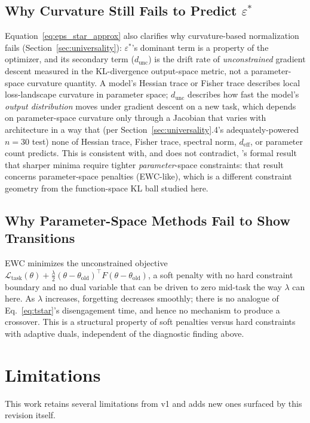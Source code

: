 \documentclass[11pt]{article}
\newcommand{\eps}{\varepsilon}
\newcommand{\epsstar}{\eps^{*}}
\begin{document}
\subsection{Why Curvature Still Fails to Predict $\epsstar$}
Equation~\ref{eq:eps_star_approx} also clarifies why curvature-based
normalization fails (Section~\ref{sec:universality}): $\epsstar$'s dominant
term is a property of the optimizer, and its secondary term
($d_{\mathrm{unc}}$) is the drift rate of \emph{unconstrained} gradient
descent measured in the KL-divergence output-space metric, not a
parameter-space curvature quantity. A model's Hessian trace or Fisher trace
describes local loss-landscape curvature in parameter space; $d_{\mathrm{unc}}$
describes how fast the model's \emph{output distribution} moves under
gradient descent on a new task, which depends on parameter-space curvature
only through a Jacobian that varies with architecture in a way that (per
Section~\ref{sec:universality}.4's adequately-powered $n=30$ test)
none of Hessian trace, Fisher trace, spectral norm, $d_{\mathrm{eff}}$, or
parameter count predicts. This is consistent with, and does not
contradict, \citet{parameterisolation2023}'s formal result that sharper
minima require tighter \emph{parameter}-space constraints: that result
concerns parameter-space penalties (EWC-like), which is a different
constraint geometry from the function-space KL ball studied here.

\subsection{Why Parameter-Space Methods Fail to Show Transitions}
EWC minimizes the unconstrained objective $\mathcal{L}_{\mathrm{task}}(\theta)
+ \frac{\lambda}{2}(\theta-\theta_{\mathrm{old}})^\top F(\theta-\theta_{\mathrm{old}})$,
a soft penalty with no hard constraint boundary and no dual variable that
can be driven to zero mid-task the way $\lambda$ can here. As $\lambda$
increases, forgetting decreases smoothly; there is no analogue of
Eq.~\ref{eq:tstar}'s disengagement time, and hence no mechanism to produce a
crossover. This is a structural property of soft penalties versus hard
constraints with adaptive duals, independent of the diagnostic finding
above.

\section{Limitations}
\label{sec:limitations}
This work retains several limitations from v1 and adds new ones surfaced by
this revision itself.
\end{document}
